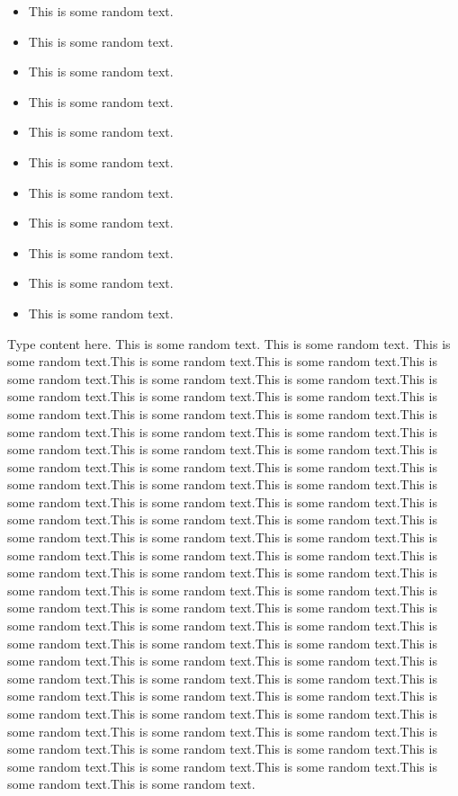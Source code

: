 \begin{itemize}
	\item This is some random text.
	\item This is some random text.
	\item This is some random text.
	\item This is some random text.
	\item This is some random text.
	\item This is some random text.
	\item This is some random text.
	\item This is some random text.
	\item This is some random text.
	\item This is some random text.
	\item This is some random text.
\end{itemize}
Type content here. This is some random text. This is some random text. This is some random text.This is some random text.This is some random text.This is some random text.This is some random text.This is some random text.This is some random text.This is some random text.This is some random text.This is some random text.This is some random text.This is some random text.This is some random text.This is some random text.This is some random text.This is some random text.This is some random text.This is some random text.This is some random text.This is some random text.This is some random text.This is some random text.This is some random text.This is some random text.This is some random text.This is some random text.This is some random text.This is some random text.This is some random text.This is some random text.This is some random text.This is some random text.This is some random text.This is some random text.This is some random text.This is some random text.This is some random text.This is some random text.This is some random text.This is some random text.This is some random text.This is some random text.This is some random text.This is some random text.This is some random text.This is some random text.This is some random text.This is some random text.This is some random text.This is some random text.This is some random text.This is some random text.This is some random text.This is some random text.This is some random text.This is some random text.This is some random text.This is some random text.This is some random text.This is some random text.This is some random text.This is some random text.This is some random text.This is some random text.This is some random text.This is some random text.This is some random text.This is some random text.This is some random text.This is some random text.This is some random text.This is some random text.This is some random text.This is some random text.

